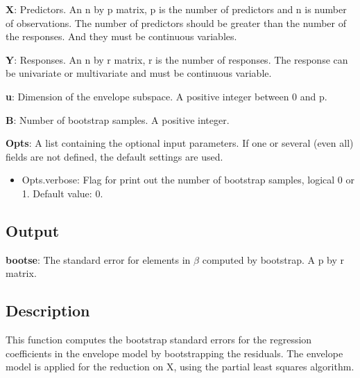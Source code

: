 \documentclass[a4paper,11pt,openany]{memoir}
\begin{document}
\begin{par}
\textbf{X}: Predictors. An n by p matrix, p is the number of predictors and n is number of observations. The number of predictors should be greater than the number of the responses. And they must be continuous variables.
\end{par} \vspace{1em}
\begin{par}
\textbf{Y}: Responses. An n by r matrix, r is the number of responses. The response can be univariate or multivariate and must be continuous variable.
\end{par} \vspace{1em}
\begin{par}
\textbf{u}: Dimension of the envelope subspace.  A positive integer between 0 and p.
\end{par} \vspace{1em}
\begin{par}
\textbf{B}: Number of bootstrap samples.  A positive integer.
\end{par} \vspace{1em}
\begin{par}
\textbf{Opts}: A list containing the optional input parameters. If one or several (even all) fields are not defined, the default settings are used.
\end{par} \vspace{1em}
\begin{itemize}
\setlength{\itemsep}{-1ex}
   \item Opts.verbose: Flag for print out the number of bootstrap samples, logical 0 or 1. Default value: 0.
\end{itemize}


\subsection*{Output}

\begin{par}
\textbf{bootse}: The standard error for elements in $\beta$ computed by bootstrap.  A p by r matrix.
\end{par} \vspace{1em}


\subsection*{Description}

\begin{par}
This function computes the bootstrap standard errors for the regression coefficients in the envelope model by bootstrapping the residuals. The envelope model is applied for the reduction on X, using the partial least squares algorithm.
\end{par} \vspace{1em}
\end{document}
